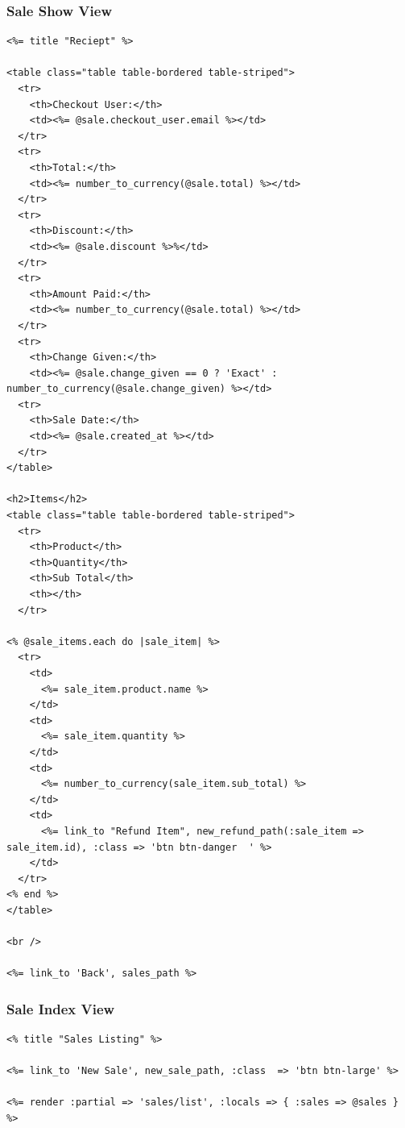 \documentclass[a4paper]{article}
\begin{document}
\subsubsection{Sale Show View}
\begin{verbatim}
<%= title "Reciept" %>

<table class="table table-bordered table-striped">
  <tr>
    <th>Checkout User:</th>
    <td><%= @sale.checkout_user.email %></td>
  </tr>
  <tr>
    <th>Total:</th>
    <td><%= number_to_currency(@sale.total) %></td>
  </tr>
  <tr>
    <th>Discount:</th>
    <td><%= @sale.discount %>%</td>
  </tr>
  <tr>
    <th>Amount Paid:</th>
    <td><%= number_to_currency(@sale.total) %></td>
  </tr>
  <tr>
    <th>Change Given:</th>
    <td><%= @sale.change_given == 0 ? 'Exact' : number_to_currency(@sale.change_given) %></td>
  <tr>
    <th>Sale Date:</th>
    <td><%= @sale.created_at %></td>
  </tr>
</table>

<h2>Items</h2>
<table class="table table-bordered table-striped">
  <tr>
    <th>Product</th>
    <th>Quantity</th>
    <th>Sub Total</th>
    <th></th>
  </tr>

<% @sale_items.each do |sale_item| %>
  <tr>
    <td>
      <%= sale_item.product.name %>
    </td>
    <td>
      <%= sale_item.quantity %>
    </td>
    <td>
      <%= number_to_currency(sale_item.sub_total) %>
    </td>
    <td>
      <%= link_to "Refund Item", new_refund_path(:sale_item => sale_item.id), :class => 'btn btn-danger  ' %>
    </td>
  </tr>
<% end %>
</table>

<br />

<%= link_to 'Back', sales_path %>

\end{verbatim}
\subsubsection{Sale Index View}
\begin{verbatim}
<% title "Sales Listing" %>

<%= link_to 'New Sale', new_sale_path, :class  => 'btn btn-large' %>

<%= render :partial => 'sales/list', :locals => { :sales => @sales } %>

\end{verbatim} 
\end{document}
